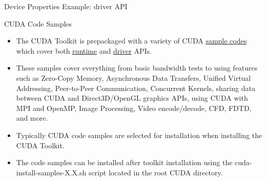 \documentclass[handout]{beamer}
\begin{document}
\begin{frame}[fragile]{Device Properties Example: driver API}

\end{frame}

\begin{frame}{CUDA Code Samples}
\begin{itemize}
\itemsep1em
	\item<1->The CUDA Toolkit is prepackaged with a variety of CUDA \href{http://docs.nvidia.com/cuda/cuda-samples/index.html\#samples-reference}{\color{blue}sample codes} which cover both \href{http://docs.nvidia.com/cuda/cuda-samples/index.html\#runtime-cudaapi}{\color{blue}runtime} and \href{http://docs.nvidia.com/cuda/cuda-samples/index.html\#driver-cudaapi}{\color{blue}driver} APIs.
	\item<1->These samples cover everything from basic bandwidth tests to using features such as Zero-Copy Memory, Asynchronous Data Transfers, Unified Virtual Addressing, Peer-to-Peer Communication, Concurrent Kernels, sharing data between CUDA and Direct3D/OpenGL graphics APIs, using CUDA with MPI and OpenMP, Image Processing, Video encode/decode, CFD, FDTD, and more.
	\item<1->Typically CUDA code samples are selected for installation when installing the CUDA Toolkit.
	\item<1->The code samples can be installed after toolkit installation using the {\selectfont cuda-install-samples-X.X.sh} script located in the root CUDA directory.
	 
\end{itemize}
\end{frame}
\end{document}
